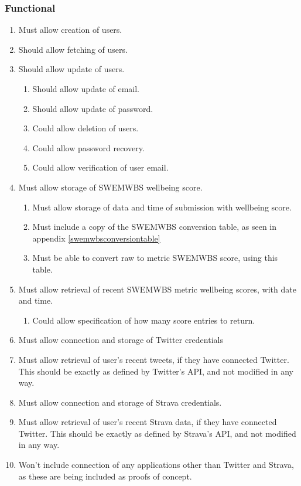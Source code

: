 \documentclass[11pt,openright,a4paper]{report}
\begin{document}
\subsubsection{Functional}
\begin{enumerate}
\item Must allow creation of users.
\item Should allow fetching of users.
\item Should allow update of users.
  \begin{enumerate}
  \item Should allow update of email.
  \item Should allow update of password.
  \item Could allow deletion of users.
  \item Could allow password recovery.
  \item Could allow verification of user email.
  \end{enumerate}
\item Must allow storage of SWEMWBS wellbeing score.
  \begin{enumerate}
  \item Must allow storage of data and time of submission with wellbeing score.
  \item Must include a copy of the SWEMWBS conversion table, as seen in appendix \ref{swemwbsconversiontable}
  \item Must be able to convert raw to metric SWEMWBS score, using this table.
  \end{enumerate}
\item Must allow retrieval of recent SWEMWBS metric wellbeing scores, with date and time.
  \begin{enumerate}
  \item Could allow specification of how many score entries to return.
  \end{enumerate}
\item Must allow connection and storage of Twitter credentials
\item Must allow retrieval of user's recent tweets, if they have connected Twitter. This should be exactly as defined by Twitter's API, and not modified in any way.
\item Must allow connection and storage of Strava credentials.
\item Must allow retrieval of user's recent Strava data, if they have connected Twitter. This should be exactly as defined by Strava's API, and not modified in any way.
\item Won't include connection of any applications other than Twitter and Strava, as these are being included as proofs of concept.

\end{enumerate}
\end{document}
